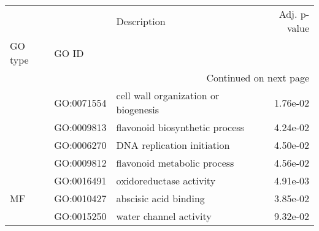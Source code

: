 \begin{longtable}{lllr}
\toprule
   &            &                           Description &  Adj. p-value \\
GO type & GO ID &                                       &               \\
\midrule
\endhead
\midrule
\multicolumn{4}{r}{{Continued on next page}} \\
\midrule
\endfoot

\bottomrule
\endlastfoot
\multirow{4}{*}{BP} & GO:0071554 &  cell wall organization or biogenesis &      1.76e-02 \\
   & GO:0009813 &        flavonoid biosynthetic process &      4.24e-02 \\
   & GO:0006270 &            DNA replication initiation &      4.50e-02 \\
   & GO:0009812 &           flavonoid metabolic process &      4.56e-02 \\
\cline{1-4}
\multirow{3}{*}{MF} & GO:0016491 &               oxidoreductase activity &      4.91e-03 \\
   & GO:0010427 &                 abscisic acid binding &      3.85e-02 \\
   & GO:0015250 &                water channel activity &      9.32e-02 \\
\end{longtable}